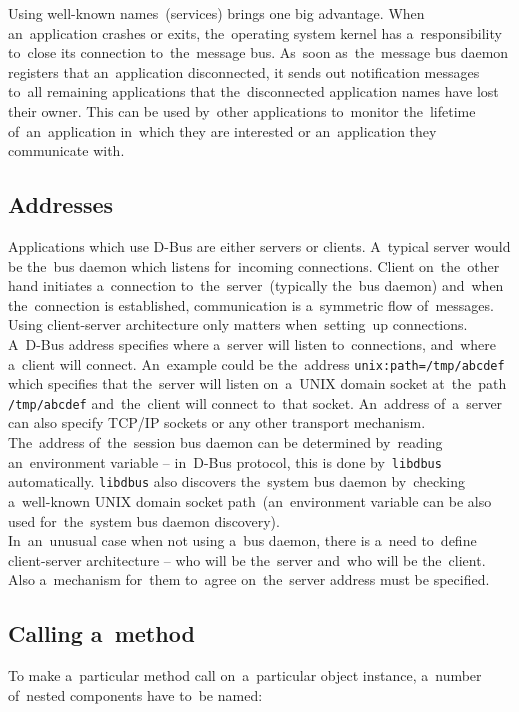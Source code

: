 Using well-known names~(services) brings one big advantage. When an~application
crashes or exits, the~operating system kernel has a~responsibility to~close
its connection to~the~message bus. As~soon as~the~message bus daemon registers
that an~application disconnected, it sends out notification messages to~all remaining
applications that the~disconnected application names have lost their owner.
This can be used by~other applications to~monitor the~lifetime of~an~application
in~which they are interested or an~application they communicate with.

\subsection{Addresses}
Applications which use D-Bus are either servers or clients. A~typical server
would be the~bus daemon which listens for~incoming connections. Client on~the~other
hand initiates a~connection to~the~server~(typically the~bus daemon) and~when
the~connection is established, communication is a~symmetric flow of~messages. Using
client-server architecture only matters when~setting~up connections.\\

A~D-Bus address specifies where a~server will listen to~connections, and~where
a~client will connect. An~example could be the~address \texttt{unix:path=/tmp/abcdef}
which specifies that the~server will listen on~a~UNIX domain socket at~the~path
\texttt{/tmp/abcdef} and~the~client will connect to~that socket. An~address
of~a~server can also specify TCP/IP sockets or any other transport mechanism.\\

The~address of~the~session bus daemon can be determined by~reading
an~environment variable -- in~D-Bus protocol, this is done by~\texttt{libdbus}
automatically. \texttt{libdbus} also discovers the~system bus daemon
by~checking a~well-known UNIX domain socket path~(an~environment variable can be
also used for~the~system bus daemon discovery).\\

In~an~unusual case when not using a~bus daemon, there is a~need to~define
client-server architecture -- who will be the~server and~who will be the~client.
Also a~mechanism for~them to~agree on~the~server address must be specified.\\

\subsection{Calling a~method}
To make a~particular method call on~a~particular object instance, a~number
of~nested components have to~be named:\\

